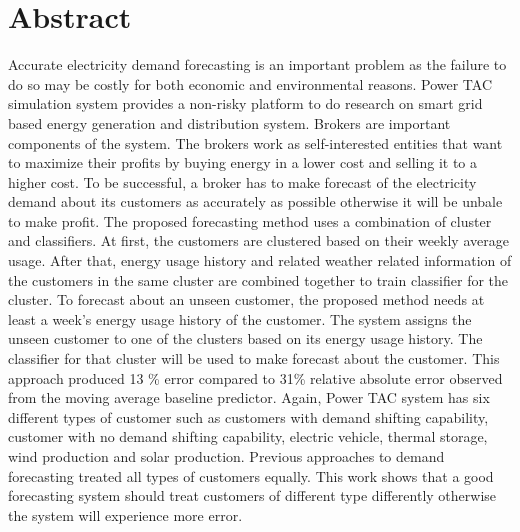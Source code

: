 

\chapter*{Abstract}

Accurate electricity demand forecasting is an important problem as the failure to do so may be costly for both economic and environmental reasons. Power TAC simulation system provides a non-risky platform to do research on smart grid based energy generation and distribution system. Brokers are important components of the system. The brokers work as self-interested entities that want to maximize their profits by buying energy in a lower cost and selling it to a higher cost. To be successful, a broker has to make forecast of the electricity demand about its customers as accurately as possible otherwise it will be unbale to make profit. The proposed forecasting method uses a combination of cluster and classifiers. At first, the customers are clustered based on their weekly average usage. After that, energy usage history and related weather related information of the customers in the same cluster are combined together to train classifier for the cluster. To forecast about an unseen customer, the proposed method needs at least a week's energy usage history of the customer. The system assigns the  unseen customer to one of the clusters based on its energy usage history. The classifier for that cluster will be used to make forecast about the customer. This approach produced 13 \% error compared to 31\% relative absolute error observed from the moving average baseline predictor. Again, Power TAC system has six different types of customer such as customers with demand shifting capability, customer with no demand shifting capability, electric vehicle, thermal storage, wind production and solar production. Previous approaches to demand forecasting treated all types of customers equally. This work shows that a good forecasting system should treat customers of different type differently otherwise the system will experience more error.
